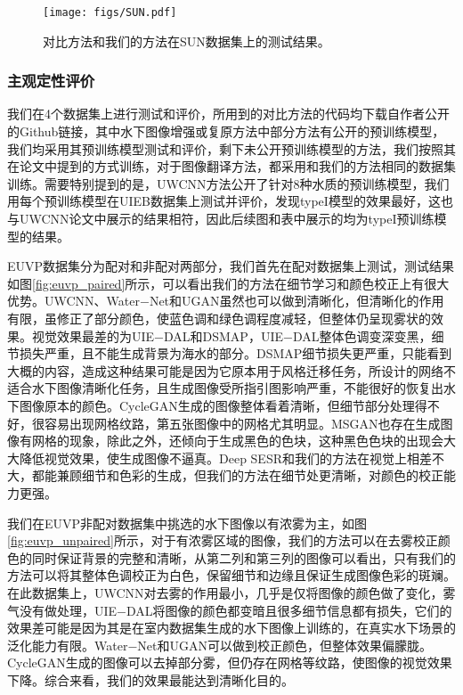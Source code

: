 \begin{figure}
    \centering
	\texttt{[image: figs/SUN.pdf]}
	\caption{对比方法和我们的方法在SUN数据集上的测试结果。}
	\label{fig:SUN}
\end{figure}

\subsubsection{主观定性评价}

我们在4个数据集上进行测试和评价，所用到的对比方法的代码均下载自作者公开的Github链接，其中水下图像增强或复原方法中部分方法有公开的预训练模型，我们均采用其预训练模型测试和评价，剩下未公开预训练模型的方法，我们按照其在论文中提到的方式训练，对于图像翻译方法，都采用和我们的方法相同的数据集训练。需要特别提到的是，UWCNN方法公开了针对8种水质的预训练模型，我们用每个预训练模型在UIEB数据集上测试并评价，发现typeI模型的效果最好，这也与UWCNN论文中展示的结果相符，因此后续图和表中展示的均为typeI预训练模型的结果。

EUVP数据集分为配对和非配对两部分，我们首先在配对数据集上测试，测试结果如图\ref{fig:euvp_paired}所示，可以看出我们的方法在细节学习和颜色校正上有很大优势。UWCNN、Water$-$Net和UGAN虽然也可以做到清晰化，但清晰化的作用有限，虽修正了部分颜色，使蓝色调和绿色调程度减轻，但整体仍呈现雾状的效果。视觉效果最差的为UIE$-$DAL和DSMAP，UIE$-$DAL整体色调变深变黑，细节损失严重，且不能生成背景为海水的部分。DSMAP细节损失更严重，只能看到大概的内容，造成这种结果可能是因为它原本用于风格迁移任务，所设计的网络不适合水下图像清晰化任务，且生成图像受所指引图影响严重，不能很好的恢复出水下图像原本的颜色。CycleGAN生成的图像整体看着清晰，但细节部分处理得不好，很容易出现网格纹路，第五张图像中的网格尤其明显。MSGAN也存在生成图像有网格的现象，除此之外，还倾向于生成黑色的色块，这种黑色色块的出现会大大降低视觉效果，使生成图像不逼真。Deep SESR和我们的方法在视觉上相差不大，都能兼顾细节和色彩的生成，但我们的方法在细节处更清晰，对颜色的校正能力更强。

我们在EUVP非配对数据集中挑选的水下图像以有浓雾为主，如图\ref{fig:euvp_unpaired}所示，对于有浓雾区域的图像，我们的方法可以在去雾校正颜色的同时保证背景的完整和清晰，从第二列和第三列的图像可以看出，只有我们的方法可以将其整体色调校正为白色，保留细节和边缘且保证生成图像色彩的斑斓。在此数据集上，UWCNN对去雾的作用最小，几乎是仅将图像的颜色做了变化，雾气没有做处理，UIE$-$DAL将图像的颜色都变暗且很多细节信息都有损失，它们的效果差可能是因为其是在室内数据集生成的水下图像上训练的，在真实水下场景的泛化能力有限。Water$-$Net和UGAN可以做到校正颜色，但整体效果偏朦胧。CycleGAN生成的图像可以去掉部分雾，但仍存在网格等纹路，使图像的视觉效果下降。综合来看，我们的效果最能达到清晰化目的。

